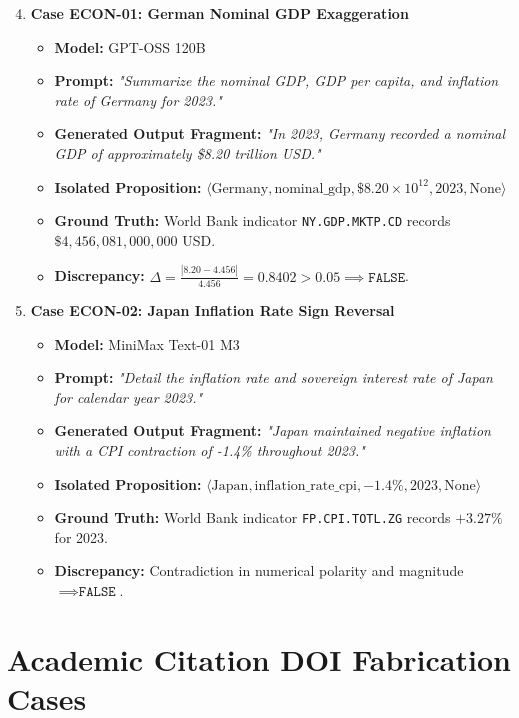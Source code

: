 \begin{enumerate}
    \setcounter{enumi}{3}
    \item \textbf{Case ECON-01: German Nominal GDP Exaggeration}
    \begin{itemize}
        \item \textbf{Model:} GPT-OSS 120B
        \item \textbf{Prompt:} \textit{"Summarize the nominal GDP, GDP per capita, and inflation rate of Germany for 2023."}
        \item \textbf{Generated Output Fragment:} \textit{"In 2023, Germany recorded a nominal GDP of approximately \$8.20 trillion USD."}
        \item \textbf{Isolated Proposition:} $\langle \text{Germany}, \text{nominal\_gdp}, \$8.20\times 10^{12}, 2023, \text{None} \rangle$
        \item \textbf{Ground Truth:} World Bank indicator \texttt{NY.GDP.MKTP.CD} records $\$4,456,081,000,000$ USD.
        \item \textbf{Discrepancy:} $\Delta = \frac{|8.20 - 4.456|}{4.456} = 0.8402 > 0.05 \implies \texttt{FALSE}$.
    \end{itemize}

    \item \textbf{Case ECON-02: Japan Inflation Rate Sign Reversal}
    \begin{itemize}
        \item \textbf{Model:} MiniMax Text-01 M3
        \item \textbf{Prompt:} \textit{"Detail the inflation rate and sovereign interest rate of Japan for calendar year 2023."}
        \item \textbf{Generated Output Fragment:} \textit{"Japan maintained negative inflation with a CPI contraction of -1.4\% throughout 2023."}
        \item \textbf{Isolated Proposition:} $\langle \text{Japan}, \text{inflation\_rate\_cpi}, -1.4\%, 2023, \text{None} \rangle$
        \item \textbf{Ground Truth:} World Bank indicator \texttt{FP.CPI.TOTL.ZG} records $+3.27\%$ for 2023.
        \item \textbf{Discrepancy:} Contradiction in numerical polarity and magnitude $\implies \texttt{FALSE}$.
    \end{itemize}
\end{enumerate}

\section{Academic Citation DOI Fabrication Cases}
\label{sec:app_citation_cases}

